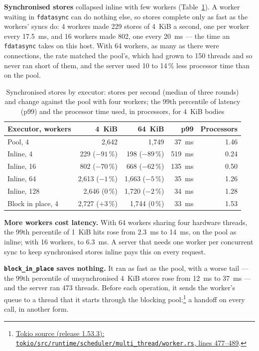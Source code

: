 \textbf{Synchronised stores} collapsed inline with few workers
(Table~\ref{tab:executor-strict}). A worker waiting in \texttt{fdatasync}
can do nothing else, so stores complete only as fast as the workers' syncs
do: 4 workers made 229 stores of 4~KiB a second, one per worker every
17.5~ms, and 16 workers made 802, one every 20~ms --- the time an
\texttt{fdatasync} takes on this host. With 64 workers, as many as there
were connections, the rate matched the pool's, which had grown to 150
threads and so never ran short of them, and the server used 10 to 14\,\%
less processor time than on the pool.

\begin{table}[tb]
\centering\small\renewcommand{\arraystretch}{1.3}%
\caption{Synchronised stores by executor: stores per second (median of
three rounds) and change against the pool with four workers; the 99th
percentile of latency (p99) and the processor time used, in processors, for
4~KiB bodies}%
\label{tab:executor-strict}
\begin{tabular}{|l|r|r|r|r|}
\hline
\textbf{Executor, workers} & \textbf{4~KiB} & \textbf{64~KiB} &
\textbf{p99} & \textbf{Processors} \\
\hline
Pool, 4 & 2,642 & 1,749 & 37~ms & 1.46 \\
\hline
Inline, 4 & 229 ($-91$\,\%) & 198 ($-89$\,\%) & 519~ms & 0.24 \\
\hline
Inline, 16 & 802 ($-70$\,\%) & 668 ($-62$\,\%) & 135~ms & 0.50 \\
\hline
Inline, 64 & 2,613 ($-1$\,\%) & 1,663 ($-5$\,\%) & 35~ms & 1.26 \\
\hline
Inline, 128 & 2,646 ($0$\,\%) & 1,720 ($-2$\,\%) & 34~ms & 1.28 \\
\hline
Block in place, 4 & 2,727 ($+3$\,\%) & 1,744 ($0$\,\%) & 33~ms & 1.53 \\
\hline
\end{tabular}
\end{table}

\textbf{More workers cost latency.} With 64 workers sharing four hardware
threads, the 99th percentile of 1~KiB hits rose from 2.3~ms to 14~ms, on the
pool as inline; with 16 workers, to 6.3~ms. A server that needs one worker
per concurrent sync to keep synchronised stores inline pays this on every
request.

\textbf{\texttt{block\_in\_place} saves nothing.} It ran as fast as the
pool, with a worse tail --- the 99th percentile of unsynchronised 4~KiB
stores rose from 12~ms to 37~ms --- and the server ran 473 threads. Before
each operation, it sends the worker's queue to a thread that it starts
through the blocking
pool:\footnote{\href{https://github.com/tokio-rs/tokio/blob/tokio-1.53.3/tokio/src/runtime/scheduler/multi_thread/worker.rs\#L477-L489}{Tokio
source (release 1.53.3):
\texttt{tokio/src/runtime/scheduler/multi\_thread/worker.rs}, lines
477--489}.} a handoff on every call, in another form.

